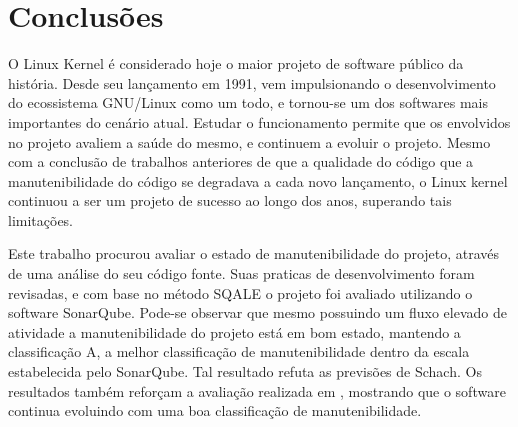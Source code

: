 \chapter{Conclusões}
\label{chapter:conclusion}

O Linux Kernel é considerado hoje o maior projeto de software público
da história. Desde seu lançamento em 1991, vem impulsionando o desenvolvimento
do ecossistema GNU/Linux como um todo, e tornou-se um dos softwares
mais importantes do cenário atual. Estudar o funcionamento permite
que os envolvidos no projeto avaliem a saúde do mesmo, e continuem
a evoluir o projeto. Mesmo com a conclusão de trabalhos anteriores
de que a qualidade do código que a manutenibilidade do código se degradava
a cada novo lançamento, o Linux kernel continuou a ser um projeto
de sucesso ao longo dos anos, superando tais limitações.

Este trabalho procurou avaliar o estado de manutenibilidade do projeto,
através de uma análise do seu código fonte. Suas praticas de desenvolvimento
foram revisadas, e com base no método SQALE o projeto foi avaliado
utilizando o software SonarQube. Pode-se observar que mesmo possuindo
um fluxo elevado de atividade a manutenibilidade do projeto está em
bom estado, mantendo a classificação A, a melhor classificação de
manutenibilidade dentro da escala estabelecida pelo SonarQube. Tal
resultado refuta as previsões de Schach\cite{schach2002maintainability}.
Os resultados também reforçam a avaliação realizada em \cite{israeli2010linux},
mostrando que o software continua evoluindo com uma boa classificação
de manutenibilidade.